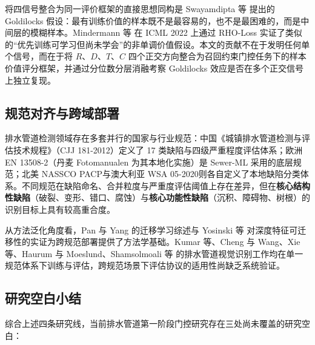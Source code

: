 \documentclass[UTF8,openany,12pt]{ctexbook}
\begin{document}
将四信号整合为同一评价框架的直接思想同构是 Swayamdipta 等\cite{swayamdipta2020cartography} 提出的 Goldilocks 假设：最有训练价值的样本既不是最容易的，也不是最困难的，而是中间层的模糊样本。Mindermann 等\cite{mindermer2022prioritized} 在 ICML 2022 上通过 RHO-Loss 实证了类似的``优先训练可学习但尚未学会''的非单调价值假设。本文的贡献不在于发明任何单个信号，而在于将 $R$、$D$、$T$、$C$ 四个正交方向整合为召回约束门控任务下的样本价值评分框架，并通过分位数分层消融考察 Goldilocks 效应是否在多个正交信号上独立复现。

\subsection{规范对齐与跨域部署}
排水管道检测领域存在多套并行的国家与行业规范：中国《城镇排水管道检测与评估技术规程》（CJJ 181-2012）\cite{cjj181}定义了 17 类缺陷与四级严重程度评估体系；欧洲 EN 13508-2（丹麦 Fotomanualen 为其本地化实施\cite{haurum2021sewerml}）是 Sewer-ML 采用的底层规范；北美 NASSCO PACP\cite{nassco2020pacp}与澳大利亚 WSA 05-2020\cite{wsa2020}则各自定义了本地缺陷分类体系。不同规范在缺陷命名、合并粒度与严重度评估阈值上存在差异，但在\textbf{核心结构性缺陷}（破裂、变形、错口、腐蚀）与\textbf{核心功能性缺陷}（沉积、障碍物、树根）的识别目标上具有较高重合度。

从方法泛化角度看，Pan 与 Yang\cite{pan2010transfer} 的迁移学习综述与 Yosinski 等\cite{yosinski2014transferable} 对深度特征可迁移性的实证为跨规范部署提供了方法学基础。Kumar 等\cite{kumar2018cnn}、Cheng 与 Wang\cite{cheng2018deep}、Xie 等\cite{xie2019hierarchical}、Haurum 与 Moeslund\cite{haurum2021sewerml}、Shamsolmoali 等\cite{shamsolmoali2025twostage} 的排水管道视觉识别工作均在单一规范体系下训练与评估，跨规范场景下评估协议的适用性尚缺乏系统验证。

\subsection{研究空白小结}
综合上述四条研究线，当前排水管道第一阶段门控研究存在三处尚未覆盖的研究空白：
\end{document}
